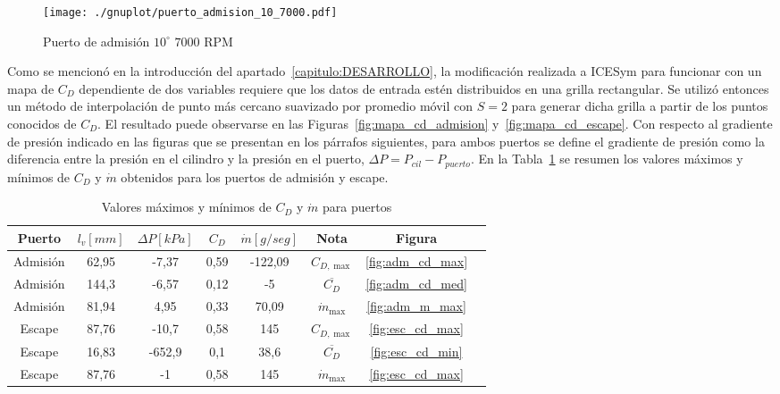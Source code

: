 \begin{figure}[h]
  \centering
  \texttt{[image: ./gnuplot/puerto\_admision\_10\_7000.pdf]}
  \caption{Puerto de admisión $10^{\circ}$ \@ $7000$ RPM}\label{fig:adm_10_7000rpm}
\end{figure}

Como se mencionó en la introducción del apartado~\ref{capitulo:DESARROLLO}, la
modificación realizada a ICESym para funcionar con un mapa de $C_{D}$
dependiente de dos variables requiere que los datos de entrada estén
distribuidos en una grilla rectangular.
%
Se utilizó entonces un método de interpolación de punto más cercano suavizado
por promedio móvil con $S=2$ para generar dicha grilla a partir de los puntos
conocidos de $C_{D}$.
%
El resultado puede observarse en las Figuras~\ref{fig:mapa_cd_admision}
y~\ref{fig:mapa_cd_escape}.
%
Con respecto al gradiente de presión indicado en las figuras que se presentan en
los párrafos siguientes, para ambos puertos se define el gradiente de presión
como la diferencia entre la presión en el cilindro y la presión en el puerto,
$\Delta P = P_{cil} - P_{puerto}$.
%
En la Tabla~\ref{tab:resumen_puertos} se resumen los valores máximos y mínimos
de $C_{D}$ y $\dot{m}$ obtenidos para los puertos de admisión y escape.

\begin{table}[h]
  \centering
  \begin{tabular}{cccccccc}\toprule
    Puerto & $l_{v} [mm]$ & $\Delta P [kPa]$ & $C_{D}$ & $\dot{m} [g/seg]$ & Nota & Figura\\ \midrule
    Admisión & 62,95 & -7,37 & 0,59 & -122,09 & $C_{D,\max}$ &\ref{fig:adm_cd_max} \\
    Admisión & 144,3 & -6,57 & 0,12 &      -5 & $\overline{C_{D}}$ &\ref{fig:adm_cd_med} \\
    Admisión & 81,94 &  4,95 & 0,33 &   70,09 & $\dot{m}_{\max}$ &\ref{fig:adm_m_max} \\
    Escape   & 87,76 & -10,7 & 0,58 &     145 & $C_{D,\max}$ &\ref{fig:esc_cd_max}\\
    Escape   & 16,83 &-652,9 &  0,1 &    38,6 & $\overline{C_{D}}$ &\ref{fig:esc_cd_min}\\
    Escape   & 87,76 &    -1 & 0,58 &     145 & $\dot{m}_{\max}$ &\ref{fig:esc_cd_max}\\
  \end{tabular}
  \caption{Valores máximos y mínimos de $C_{D}$ y $\dot{m}$ para puertos}\label{tab:resumen_puertos}
\end{table}


